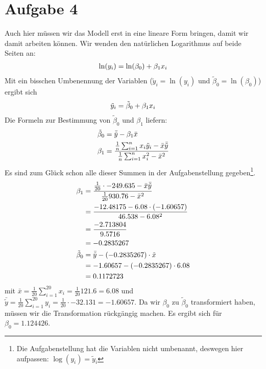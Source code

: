 \documentclass{article}
\begin{document}
	\section*{Aufgabe 4}
	Auch hier müssen wir das Modell erst in eine lineare Form bringen, damit wir damit arbeiten können. Wir wenden den natürlichen Logarithmus auf beide Seiten an:
	\begin{align}
		\ln(y_i) = \ln(\beta_0) + \beta_1x_i \notag
	\end{align}
	Mit ein bisschen Umbenennung der Variablen ($\tilde{y}_i = \ln(y_i)$ und $\tilde{\beta}_0 = \ln(\beta_0)$) ergibt sich
	\begin{align}
		\tilde{y}_i = \tilde{\beta}_0 + \beta_1x_i \notag
	\end{align}
	Die Formeln zur Bestimmung von $\tilde{\beta}_0$ und $\beta_1$ liefern:
	\begin{align}
		\tilde{\beta}_0 &= \bar{\tilde{y}} - \beta_1\bar{x} \notag \\
		\beta_1 &= \frac{\frac{1}{n}\sum_{i=1}^n x_i\tilde{y}_i - \bar{x}\bar{\tilde{y}}}{\frac{1}{n}\sum_{i=1}^n x_i^2 - \bar{x}^2} \notag
	\end{align}
	Es sind zum Glück schon alle dieser Summen in der Aufgabenstellung gegeben\footnote{Die Aufgabenstellung hat die Variablen nicht umbenannt, deswegen hier aufpassen: $\log(y_i) = \tilde{y}_i$}.
	\begin{align}
		\beta_1 &= \frac{\frac{1}{20}\cdot -249.635 - \bar{x}\bar{\tilde{y}}}{\frac{1}{20}930.76 - \bar{x}^2} \notag \\
		&= \frac{-12.48175 - 6.08\cdot (-1.60657)}{46.538 - 6.08^2} \notag \\
		&= \frac{-2.713804}{9.5716} \notag \\
		&= -0.2835267 \notag \\
		\tilde{\beta}_0 &= \bar{\tilde{y}} - (-0.2835267)\cdot\tilde{x} \notag \\
		&= -1.60657 - (-0.2835267) \cdot 6.08 \notag \\
		&= 0.1172723 \notag
	\end{align}
	mit $\bar{x} = \frac{1}{20}\sum_{i=1}^20 x_i = \frac{1}{20}121.6 = 6.08$ und $\bar{\tilde{y}} = \frac{1}{20}\sum_{i=1}^20 y_i = \frac{1}{20}\cdot -32.131 = -1.60657$. Da wir $\beta_0$ zu $\tilde{\beta}_0$ transformiert haben, müssen wir die Transformation rückgängig machen. Es ergibt sich für $\beta_0 = 1.124426$.
	
\end{document}
